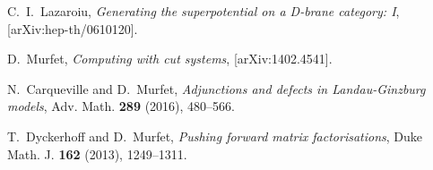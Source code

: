 \documentclass[english,letter paper,12pt,leqno]{article}
\theoremstyle{example}
\numberwithin{equation}{section}
\begin{document}
\providecommand{\href}[2]{#2}
\begin{thebibliography}{BHLS03}
  
C.~I.~Lazaroiu, \textsl{Generating the superpotential on a D-brane category: I}, [arXiv:hep-th/0610120].
  
D.~Murfet, \textsl{Computing with cut systems}, \href{http://arxiv.org/abs/1402.4541}{[arXiv:1402.4541]}.

N.~Carqueville and D.~Murfet, \textsl{Adjunctions and defects in Landau-Ginzburg models}, Adv. Math. \textbf{289} (2016), 480--566.

T.~Dyckerhoff and D.~Murfet, \textsl{Pushing forward matrix factorisations}, Duke Math. J. \textbf{162} (2013), 1249--1311.

\end{thebibliography}
\end{document}
